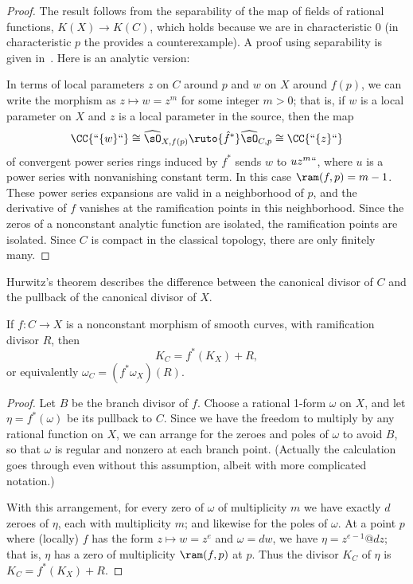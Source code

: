 \begin{proof}
The result follows from the separability of the map of fields of rational functions, $K(X) \to K(C)$, which holds because we
are in characteristic 0 (in characteristic $p$ the 
%
provides a counterexample). A proof using separability
is given in~\cite[Section IV.2]{Hartshorne1977}. Here is an analytic version:

In terms of local parameters $z$ on $C$ around $p$ and $w$ on $X$ around $f(p)$, we can write the morphism as $z \mapsto w = z^m$ for some integer $m > 0$; that is,
if $w$ is a local parameter on $X$ and $z$ is a local parameter in the source, then
the map
$$
 \CC\{` `\{w\}` `\} \cong \widehat\sO_{X,f(p)} \ruto{\hat f^*}\widehat\sO_{C,p}\cong  \CC\{` `\{z\}` `\} 
$$ 
of convergent power series rings induced by $f^*$
sends $w$ to $uz^m` `$, where $u$ is a power series with nonvanishing constant term.
In this case $\ram(f,p) = m-1$. These power series expansions are valid in a neighborhood
of $p$, and the derivative of $f$ vanishes at the ramification points in this neighborhood. Since
the zeros of a nonconstant analytic function are isolated, the ramification points are isolated. 
Since $C$ is compact in the classical topology, there are only finitely many.
\end{proof}

Hurwitz's theorem describes the difference between the canonical
divisor of $C$ and the pullback of the canonical divisor of $X$.
%

\begin{theorem} 
{\rm\cite[Proposition IV.2.3]{Hartshorne1977}} \label{Hurwitz}
If $f:C\to X$ is a nonconstant morphism of smooth curves, with ramification divisor $R$, then 
$$
K_C = f^{*}(K_{X})+R,$$
or equivalently
$
\omega_{C} = (f^{*}\omega_{X})(R).
$
\end{theorem}
 
\begin{proof}
Let $B$ be the branch divisor of $f$.
Choose a rational 1-form $\omega$ on $X$, and let $\eta = f^*(\omega)$
be its pullback to $C$. 
Since we have the freedom to multiply by any rational function on $X$,
we can arrange for 
the zeroes and poles of $\omega$ to 
avoid
$B$, so that $\omega$ 
is
regular and nonzero at each branch point. (Actually the calculation
goes through even without this assumption, albeit with more
complicated notation.)  

With this arrangement,
for every zero of $\omega$ of multiplicity $m$ we have exactly $d$
zeroes of $\eta$, each with multiplicity $m$; and likewise for the
poles of $\omega$. 
 At a point $p$ where (locally) $f$ has the form $z \mapsto w = z^{e}$
and $\omega = dw$, we have $\eta = z^{e-1}@dz$; that is, $\eta$ has a zero of multiplicity $\ram(f,p)$ at  $p$.
Thus the divisor $K_{C}$ of $\eta$ is
$K_{C} = f^{*}(K_{X})+R$.
\end{proof}

